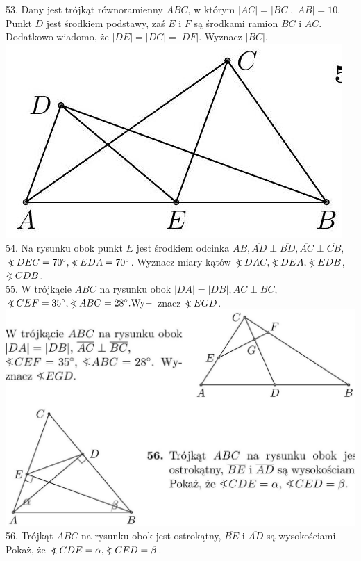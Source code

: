 \documentclass[10pt]{article}
\newcommand\Varangle{\mathop{{<\!\!\!\!\!\text{\small)}}\:}\nolimits}
\begin{document}
53. Dany jest trójkąt równoramienny \(A B C\), w którym \(|A C|=|B C|,|A B|=10\). Punkt \(D\) jest środkiem podstawy, zaś \(E\) i \(F\) są środkami ramion \(B C\) i \(A C\). Dodatkowo wiadomo, że \(|D E|=|D C|=|D F|\). Wyznacz \(|B C|\).\\
\includegraphics[max width=\textwidth, center]{2024_11_21_71f62bd117d375398909g-192}\\
54. Na rysunku obok punkt \(E\) jest środkiem odcinka \(A B, \overline{A D} \perp \overline{B D}, \overline{A C} \perp \overline{C B}\), \(\Varangle D E C=70^{\circ}, \Varangle E D A=70^{\circ}\). Wyznacz miary kątów \(\Varangle D A C, \Varangle D E A, \Varangle E D B\), \(\Varangle C D B\).\\
55. W trójkącie \(A B C\) na rysunku obok \(|D A|=|D B|, \overline{A C} \perp \overline{B C}\), \(\Varangle C E F=35^{\circ}, \Varangle A B C=28^{\circ} . \mathrm{Wy}-\) znacz \(\Varangle E G D\).\\
\includegraphics[max width=\textwidth, center]{2024_11_21_71f62bd117d375398909g-192(1)}\\
56. Trójkąt \(A B C\) na rysunku obok jest ostrokątny, \(\overline{B E}\) i \(\overline{A D}\) są wysokościami. Pokaż, że \(\Varangle C D E=\alpha, \Varangle C E D=\beta\).
\end{document}
